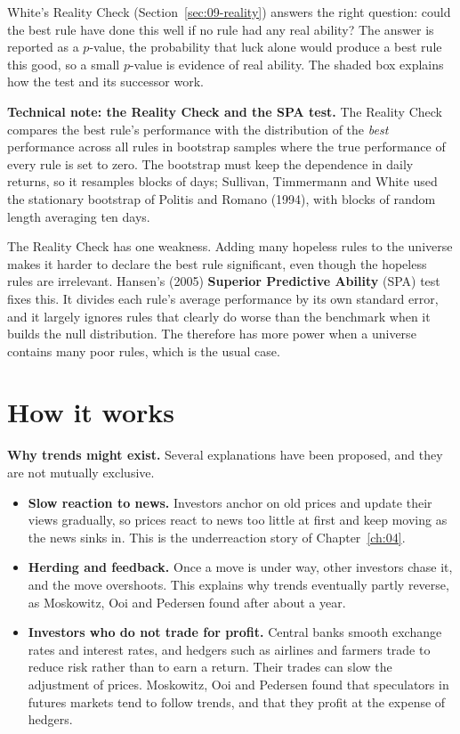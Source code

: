 White's Reality Check (Section~\ref{sec:09-reality}) answers the right question: could the best rule have done this well if no rule had any real ability? The answer is reported as a $p$-value, the probability that luck alone would produce a best rule this good, so a small $p$-value is evidence of real ability. The shaded box explains how the test and its successor work.

\begin{technote}
\textbf{Technical note: the Reality Check and the SPA test.} The Reality Check compares the best rule's performance with the distribution of the \emph{best} performance across all rules in bootstrap samples where the true performance of every rule is set to zero. The bootstrap must keep the dependence in daily returns, so it resamples blocks of days; Sullivan, Timmermann and White used the stationary bootstrap of Politis and Romano (1994), with blocks of random length averaging ten days.

The Reality Check has one weakness. Adding many hopeless rules to the universe makes it harder to declare the best rule significant, even though the hopeless rules are irrelevant. Hansen's (2005) \textbf{Superior Predictive Ability} (SPA) test fixes this. It divides each rule's average performance by its own standard error, and it largely ignores rules that clearly do worse than the benchmark when it builds the null distribution. The  therefore has more power when a universe contains many poor rules, which is the usual case.
\end{technote}


\section{How it works}
\label{sec:08-how}

\textbf{Why trends might exist.} Several explanations have been proposed, and they are not mutually exclusive.

\begin{itemize}
  \item \textbf{Slow reaction to news.} Investors anchor on old prices and update their views gradually, so prices react to news too little at first and keep moving as the news sinks in. This is the underreaction story of Chapter~\ref{ch:04}.
  \item \textbf{Herding and feedback.} Once a move is under way, other investors chase it, and the move overshoots. This explains why trends eventually partly reverse, as Moskowitz, Ooi and Pedersen found after about a year.
  \item \textbf{Investors who do not trade for profit.} Central banks smooth exchange rates and interest rates, and hedgers such as airlines and farmers trade to reduce risk rather than to earn a return. Their trades can slow the adjustment of prices. Moskowitz, Ooi and Pedersen found that speculators in futures markets tend to follow trends, and that they profit at the expense of hedgers.
\end{itemize}

